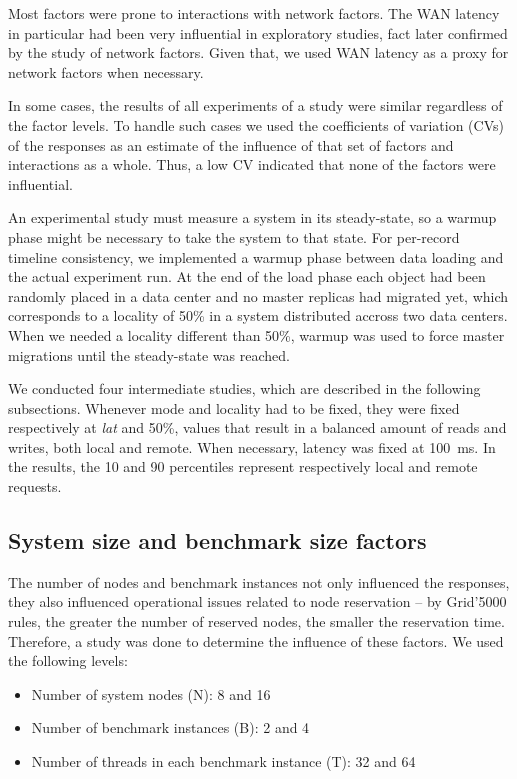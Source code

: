 \documentclass[doublespacing]{bmcart}
\begin{document}
Most factors were prone to interactions with network factors. The WAN latency
in particular had been very influential in exploratory studies, fact later
confirmed by the study of network factors. Given that, we used WAN latency as a
proxy for network factors when necessary.

In some cases, the results of all experiments of a study were similar
regardless of the factor levels. To handle such cases we used the coefficients
of variation (CVs) of the responses as an estimate of the influence of that set
of factors and interactions as a whole. Thus, a low CV indicated that none of
the factors were influential.

An experimental study must measure a system in its steady-state, so a warmup
phase might be necessary to take the system to that state. For per-record
timeline consistency, we implemented a warmup phase between data loading and
the actual experiment run. At the end of the load phase each object had been
randomly placed in a data center and no master replicas had migrated yet, which
corresponds to a locality of 50\% in a system distributed accross two data
centers. When we needed a locality different than 50\%, warmup was used to
force master migrations until the steady-state was reached.

We conducted four intermediate studies, which are described in the following
subsections. Whenever mode and locality had to be fixed, they were fixed
respectively at \textit{lat} and 50\%, values that result in a balanced amount
of reads and writes, both local and remote. When necessary, latency was fixed
at 100~ms. In the results, the 10 and 90 percentiles represent respectively
local and remote requests.

\subsection{System size and benchmark size factors}

The number of nodes and benchmark instances not only influenced the
responses, they also influenced operational issues related to node reservation --
by Grid'5000 rules, the greater the number of reserved nodes, the smaller the
reservation time. Therefore, a study was done to determine the influence of
these factors. We used the following levels:

\begin{itemize}

\item Number of system nodes (N): 8 and 16

\item Number of benchmark instances (B): 2 and 4

\item Number of threads in each benchmark instance (T): 32 and 64

\end{itemize}
\end{document}

